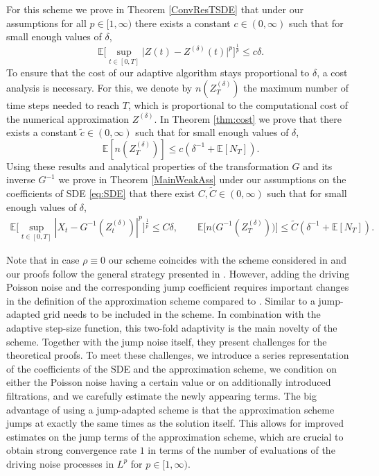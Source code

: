 \documentclass[11pt,a4paper]{article}
\numberwithin{equation}{section}
\theoremstyle{definition}
\newcommand{\E}{{\mathbb{E}}}
\begin{document}
For this scheme we prove in Theorem \ref{ConvResTSDE} that under our assumptions for all $p\in[1,\infty)$ there exists a constant $c\in(0,\infty)$ such that for small enough values of $\delta$,
\[\E\Big[\sup_{t\in[0,T]}\big| Z(t) - Z^{(\delta)}(t)\big|^p \Big]^{\frac{1}{p}} \leq c \delta.\]
To ensure that the cost of our adaptive algorithm stays proportional to $\delta$, a cost analysis is necessary. For this, we denote by $n(Z^{(\delta)}_T)$ the maximum number of time steps needed to reach $T$, which is proportional to the computational cost of the numerical approximation $Z^{(\delta)}$. In Theorem \ref{thm:cost} we prove that there exists a constant $\widetilde c\in(0,\infty)$ such that for small enough values of $\delta$,
\[ \E[n(Z^{(\delta)}_T)]\leq c(\delta^{-1}+\E[N_T]).\]
Using these results and analytical properties of the transformation $G$ and its inverse $G^{-1}$ we prove in Theorem \ref{MainWeakAss} under our assumptions on the coefficients of SDE \eqref{eq:SDE} that there exist $C,\widetilde C\in(0,\infty)$ such that for small enough values of $\delta$,
\begin{equation}
    \begin{aligned}
    \E\Big[ \sup_{t\in[0,T]} |X_t- G^{-1}(Z^{(\delta)}_t) |^p\Big]^\frac{1}{p} \leq C \delta, \qquad 
    \E\Big[n\big(G^{-1}(Z^{(\delta)}_T)\big)\Big]\leq \widetilde C (\delta^{-1}+\E[N_T]).
    \end{aligned}
\end{equation}

Note that in case $\rho \equiv 0$ our scheme coincides with the scheme considered in \cite{Yaroslavtseva2022} and our proofs follow the general strategy presented in \cite{Yaroslavtseva2022}. However, adding the driving Poisson noise and the corresponding jump coefficient requires important changes in the definition of the approximation scheme compared to \cite{Yaroslavtseva2022}. Similar to \cite{PSS2024JMS} a jump-adapted grid needs to be included in the scheme. In combination with the adaptive step-size function, this two-fold adaptivity is the main novelty of the scheme. Together with the jump noise itself, they present challenges for the theoretical proofs. To meet these challenges, we introduce a series representation of the coefficients of the SDE and the approximation scheme, we condition on either the Poisson noise having a certain value or on additionally introduced filtrations, and we carefully estimate the newly appearing terms. The big advantage of using a jump-adapted scheme is that the approximation scheme jumps at exactly the same times as the solution itself. This allows for improved estimates on the jump terms of the approximation scheme, which are crucial to obtain strong convergence rate $1$ in terms of the number of evaluations of the driving noise processes in $L^p$ for $p\in[1,\infty)$.
\end{document}

